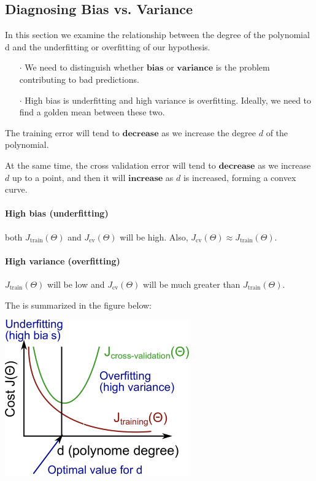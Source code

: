 \documentclass[UTF8]{article}
\begin{document}
\subsection{Diagnosing Bias vs. Variance}

In this section we examine the relationship between the degree of the polynomial d and the underfitting or overfitting of our hypothesis.

\begin{itemize}
\item[$\cdot$]We need to distinguish whether $\textbf{bias}$ or $\textbf{variance}$ is the problem contributing to bad predictions.
\item[$\cdot$]High bias is underfitting and high variance is overfitting. Ideally, we need to find a golden mean between these two.
\end{itemize}

The training error will tend to $\textbf{decrease}$ as we increase the degree $d$ of the polynomial.

At the same time, the cross validation error will tend to $\textbf{decrease}$ as we increase $d$ up to a point, and then it will $\textbf{increase}$ as $d$ is increased, forming a convex curve.

\paragraph{High bias (underfitting)} both $J_\text{train}(\Theta)$ and $J_\text{cv}(\Theta)$ will be high. Also, $J_\text{cv}(\Theta)  \approx J_\text{train}(\Theta)$.
\paragraph{High variance (overfitting)} $J_\text{train}(\Theta)$ will be low and $J_\text{cv}(\Theta)$ will be much greater than $J_\text{train}(\Theta)$.

The is summarized in the figure below:

\includegraphics[width = \textwidth]{NotePics/10_3_1.png}
\end{document}
